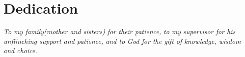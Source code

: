 \chapter*{ \textbf{\Large \sc Dedication}}
\vspace{50pt}




\begin{center}
{\centering \it To my family(mother and sisters) for their patience, to my supervisor for his unflinching support and patience, and to God for the gift of knowledge, wisdom and choice.}
\end{center}